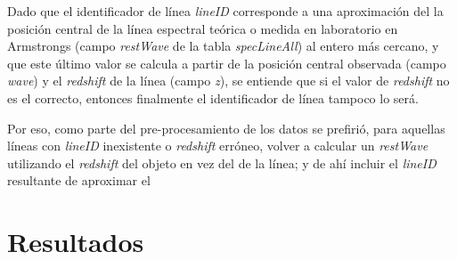 Dado que el identificador de línea \textit{lineID} corresponde a una aproximación del la posición central de la línea espectral teórica o medida en laboratorio en Armstrongs (campo \textit{restWave} de la tabla \textit{specLineAll}) al entero más cercano, y que este último valor se calcula a partir de la posición central observada (campo \textit{wave}) y el \textit{redshift} de la línea (campo \textit{z}), se entiende que si el valor de \textit{redshift} no es el correcto, entonces finalmente el identificador de línea tampoco lo será.

Por eso, como parte del pre-procesamiento de los datos se prefirió, para aquellas líneas con \textit{lineID} inexistente o \textit{redshift} erróneo, volver a calcular un \textit{restWave} utilizando el \textit{redshift} del objeto en vez del de la línea; y de ahí incluir el \textit{lineID} resultante de aproximar el 

\section{Resultados}

